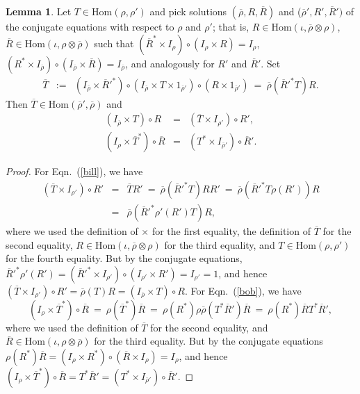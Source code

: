 \documentclass[11pt]{article}
\theoremstyle{definition}
\newtheorem{lemma}[thm]{Lemma}
\theoremstyle{definition}
\theoremstyle{remark}
\def\ol#1{{\overline #1}}
\newcommand{\Hom}{\mathrm{Hom}}
\begin{document}
\begin{lemma} Let $T\in \Hom (\rho ,\rho ')$ and pick solutions
  $(\overline{\rho},R,\overline{R})$ and ($\overline{\rho}',R',\overline{R}')$ of the
  conjugate equations with respect to $\rho$ and $\rho'$; that is, $R\in \Hom (\iota
  , \overline{\rho}\otimes \rho )$, $\overline{R}\in \Hom (\iota ,\rho \otimes
  \overline{\rho})$ such that $(\overline{R}^*\times I_\rho)\circ (I_\rho \times
  R)=I_{\rho}$, $(R^*\times I_{\overline{\rho}})\circ (I_{\overline{\rho}}\times
  \overline{R})=I_{\overline{\rho}}$, and analogously for $R'$ and $\overline{R}'$.
  Set
\begin{eqnarray*} 
  \overline{T} &:= & (I_{\overline{\rho}}\times \overline{R}'^*)\circ
  (I_{\overline{\rho}}\times T\times 1_{\overline{\rho}'})\circ (R\times
  1_{\overline{\rho}'}) \: =\: \ol\rho (\ol R'^*T)R .\end{eqnarray*}
Then $\overline{T}\in \Hom (\overline{\rho}',\overline{\rho})$ and 
\begin{eqnarray}
  (I_{\overline{\rho}}\times T)\circ R &=& (\overline{T}\times I_{\rho '})\circ R'
  , \label{bill} \\
  (I_\rho \times \overline{T}^*)\circ \overline{R} &=& (T^*\times
  I_{\overline{\rho}'})\circ \overline{R}' \label{bob} .\end{eqnarray}
\end{lemma}

\begin{proof} 
  For Eqn.\ (\ref{bill}), we have
\begin{eqnarray*}
  (\overline{T}\times I_{\rho'})\circ R' &=& \overline{T}R'
  \: =\: \overline{\rho}(\overline{R}'^*T)RR' \: =\:
  \overline{\rho}(\overline{R}'^*T\rho (R'))R \\
  &=& \overline{\rho}(\overline{R}'^*\rho '(R')T)R ,\end{eqnarray*}
where we used the definition of $\times$ for the first equality, the definition of
$\overline{T}$ for the second equality, $R\in \Hom (\iota ,\overline{\rho}\otimes \rho )$ for
the third equality, and $T\in \Hom (\rho ,\rho ')$ for the fourth equality. 
But by the conjugate equations, $\overline{R}'^*\rho '(R')=(\overline{R}'^*\times I_{\rho'})\circ (I_{\rho '}\times
R')=I_{\rho '}=1$, and hence $(\overline{T}\times I_{\rho'})\circ
R'=\overline{\rho}(T)R=(I_{\overline{\rho}}\times T)\circ R$.  For Eqn.\ (\ref{bob}),
we have 
\begin{equation}
  (I_{\rho}\times \overline{T}^*)\circ \overline{R} \: =\: \rho
  (\overline{T}^*)\overline{R} \: =\: \rho (R^*)\rho
  \overline{\rho}(T^*\overline{R}')\overline{R} \: =\: \rho
  (R^*)\overline{R}T^*\overline{R}' ,\end{equation}  
where we used the definition of $\overline{T}$ for the second equality, and
$\overline{R}\in \Hom (\iota ,\rho \otimes \overline{\rho})$ for the third equality.  But by the
conjugate equations $\rho (R^*)\overline{R}=(I_{\rho}\times R^*)\circ
(\overline{R}\times I_{\rho})=I_{\rho}$, and hence $(I_{\rho}\times
\overline{T}^*)\circ \overline{R}=T^*\overline{R}'=(T^*\times
I_{\overline{\rho}'})\circ \overline{R}'$.  
\end{proof}
\end{document}
